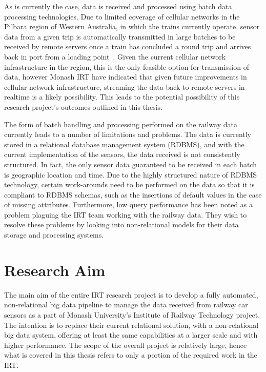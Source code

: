 As is currently the case, data is received and processed using batch data processing technologies. Due to limited coverage
of cellular networks in the Pilbara region of Western Australia, in which the trains currently operate, sensor data from
a given trip is automatically transmitted in large batches to be received by remote servers once a train has concluded a
round trip and
arrives back in port from a loading point~\cite{thomas2012taking}. Given the current cellular network infrastructure in
the region, this is the only feasible option for transmission of data, however Monash IRT have indicated that given
future improvements in cellular network infrastructure, streaming the data back to remote servers in realtime is a likely
possibility. This leads to the potential possibility of this research project's outcomes outlined in this thesis.

The form of batch handling and processing performed on the railway data currently leads to a number of limitations and
problems. The data is currently stored in a relational database management system (RDBMS), and with the current
implementation
of the sensors, the data received is not consistently structured. In fact, the only sensor data guaranteed to be received
in each batch is geographic location and time. Due to the highly structured nature of RDBMS technology, certain work-arounds
need to be performed on the data so that it is compliant to RDBMS schemas, such as the insertions of default values in
the case of missing attributes. Furthermore, low query performance has been noted as a problem plaguing the IRT team
working with the railway data. They wish to resolve these problems by looking into non-relational models for their data
storage and processing systems.





\section{Research Aim} %
\label{sec:objectives}

The main aim of the entire IRT research project is to develop a fully automated, non-relational big data pipeline to manage
the data received from railway car sensors as a part of Monash University's Institute of Railway Technology project. The
intention is to replace their current relational solution, with a non-relational big data system, offering at least the same capabilities at a larger scale and
with higher performance. The scope of the overall project is relatively large, hence what is covered in this thesis
refers to only a portion of the required work in the IRT.

